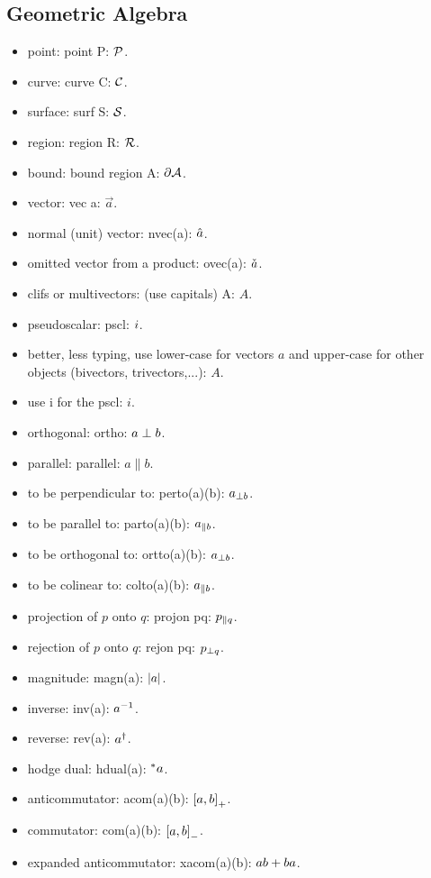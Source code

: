 \begin{multicols}{2}
\subsection{Geometric Algebra}
\begin{itemize}
\item point: point P: $\mathcal{P}$.
\item curve: curve C: $\mathcal{C}$.
\item surface: surf S: $\mathcal{S}$.
\item region: region R: $\mathcal{R}$.
\item bound: bound region A: $\partial{\mathcal{A}}$.
\item vector: vec a: $\vec a$.
\item normal (unit) vector: nvec(a): $\hat{a}$.
\item omitted vector from a product: ovec(a): $\check{a}$.
\item clifs or multivectors: (use capitals) A: $A$.
\item pseudoscalar: pscl: $i$.
\item better, less typing, use lower-case for vectors $a$ and upper-case for other objects (bivectors, trivectors,...): $A$.
\item use i for the pscl: $i$.
\item orthogonal: ortho: $a\perp b$.
\item parallel: parallel: $a\parallel b$.
\item to be perpendicular to: perto(a)(b): ${a}_{\perp{b}}$.
\item to be parallel to: parto(a)(b): ${a}_{\parallel{b}}$.
\item to be orthogonal to: ortto(a)(b): ${a}_{\perp{b}}$.
\item to be colinear to: colto(a)(b): ${a}_{\parallel{b}}$.
\item projection of $p$ onto $q$: projon pq: ${p}_{\parallel{q}}$.
\item rejection of $p$ onto $q$: rejon pq: ${p}_{\perp{q}}$.
\item magnitude: magn(a): $\lvert{a}\rvert$.
\item inverse: inv(a): ${a}^{-1}$.
\item reverse: rev(a): ${a}^{\dagger}$.
\item hodge dual: hdual(a): ${}^*{a}$.
\item anticommutator: acom(a)(b): $\left[{a},{b}\right]_{+}$.
\item commutator: com(a)(b): $\left[{a},{b}\right]_{-}$.
\item expanded anticommutator: xacom(a)(b): ${a}{b} + {b}{a}$.

\end{itemize}
\end{multicols}
